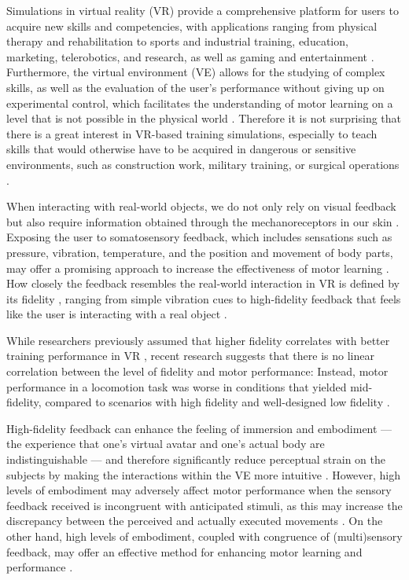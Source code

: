 \documentclass[conference]{IEEEtran}
\begin{document}
Simulations in virtual reality (VR) provide a comprehensive platform for users to acquire new skills and competencies, with applications ranging from physical therapy and rehabilitation to sports and industrial training, education, marketing, telerobotics, and research, as well as gaming and entertainment \cite{Wu2023TrainingReality, Oagaz2022PerformanceReality}. Furthermore, the virtual environment (VE) allows for the studying of complex skills, as well as the evaluation of the user's performance without giving up on experimental control, which facilitates the understanding of motor learning on a level that is not possible in the physical world \cite{Harris2021ExploringSimulator, Levac2019LearningReview}. Therefore it is not surprising that there is a great interest in VR-based training simulations, especially to teach skills that would otherwise have to be acquired in dangerous or sensitive environments, such as construction work, military training, or surgical operations \cite{Adami2021EffectivenessTeleoperation, Lele2013VirtualUtility, Qi2021VirtualScenario}.

When interacting with real-world objects, we do not only rely on visual feedback but also require information obtained through the mechanoreceptors in our skin \cite{AlexandreL.Ratschat2024EvaluatingStudy}. Exposing the user to somatosensory feedback, which includes sensations such as pressure, vibration, temperature, and the position and movement of body parts, may offer a promising approach to increase the effectiveness of motor learning \cite{Sainburg2022MovementNeurorehabilitation, Sigrist2013AugmentedReview}.
How closely the feedback resembles the real-world interaction in VR is defined by its fidelity \cite{Caird1996PersistentTraining}, ranging from simple vibration cues to high-fidelity feedback that feels like the user is interacting with a real object \cite{Yang2023TheSimulation}.  

While researchers previously assumed that higher fidelity correlates with better training performance in VR \cite{Caird1996PersistentTraining, Waller1998TheTraining}, recent research suggests that there is no linear correlation between the level of fidelity and motor performance: Instead, motor performance in a locomotion task was worse in conditions that yielded mid-fidelity, compared to scenarios with high fidelity and well-designed low fidelity \cite{MahdiNabiyouni201520153DUI.}. 

High-fidelity feedback can enhance the feeling of immersion and embodiment --- the experience that one's virtual avatar and one's actual body are indistinguishable \cite{Kilteni2012TheReality} --- and therefore significantly reduce perceptual strain on the subjects by making the interactions within the VE more intuitive \cite{Yang2023TheSimulation}. However, high levels of embodiment may adversely affect motor performance when the sensory feedback received is incongruent with anticipated stimuli, as this may increase the discrepancy between the perceived and actually executed movements \cite{Odermatt2021CongruencyReality}.
On the other hand, high levels of embodiment, coupled with congruence of (multi)sensory feedback, may offer an effective method for enhancing motor learning and performance \cite{Odermatt2021CongruencyReality}. 
\end{document}
